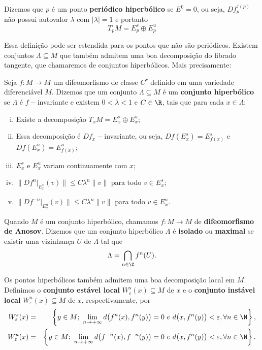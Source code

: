 Dizemos que $p$ é um ponto \textbf{periódico hiperbólico} se $E^0={0}$, ou seja, $Df_p^{\tau(p)}$ não possui autovalor $\lambda$ com $|\lambda|=1$ e portanto 
\begin{equation*}
T_pM=E_p^s\oplus E_p^u
\end{equation*}

Essa definição pode ser estendida para os pontos que não são periódicos. Existem conjuntos $\Lambda\subseteq M$ que também admitem uma boa decomposição do fibrado tangente, que chamaremos de conjuntos hiperbólicos. Mais precisamente:

\begin{definicao} Seja $f:M\to M$ um difeomorfismo de classe $C^r$ definido em uma variedade diferenciável $M$. Dizemos que um conjunto $\Lambda\subseteq M$ é um \textbf{conjunto hiperbólico} se $\Lambda$ é $f-$invariante e existem $0<\lambda<1$ e $C\in\R$, tais que para cada $x\in\Lambda$:
\begin{enumerate}[i)]
\item Existe a decomposição $T_xM=E_x^s\oplus E_x^u$;
\item Essa decomposição é $Df_x-$invariante, ou seja, $Df(E_x^s)=E_{f(x)}^s$ e $Df(E_x^u)=E_{f(x)}^u$;
\item $E^s_x$ e $E^u_x$ variam continuamente com $x$;
\item $\|Df^n|_{E_x^s}(v)\|\leq C\lambda^n\|v\|$ para todo $v\in E^s_x$;
\item $\|Df^{-n}|_{E_x^u}(v)\|\leq C\lambda^n\|v\|$ para todo $v\in E^u_x$.
\end{enumerate}
\end{definicao}

Quando $M$ é um conjunto hiperbólico, chamamos $f:M\to M$ de \textbf{difeomorfismo de Anosov}. Dizemos que um conjunto hiperbólico $\Lambda$ é \textbf{isolado} ou \textbf{maximal} se existir uma vizinhança $U$ de $\Lambda$ tal que $$\Lambda=\bigcap_{n\in\Z}f^n(U).$$ 

Os pontos hiperbólicos também admitem uma boa decomposição local em $M$. Definimos o \textbf{conjunto estável local} $W^s_{\varepsilon}(x)\subseteq M$ de $x$ e o \textbf{conjunto instável local} $W^u_{\varepsilon}(x)\subseteq M$ de $x$, respectivamente, por
\begin{eqnarray*}
W^s_{\varepsilon}(x) & = & \left\{y\in M;\ \lim_{n\to+\infty}d\big(f^n(x),f^n(y)\big)=0\ e\ d\big(x,f^n(y)\big)<\varepsilon,\forall n\in\N\right\},\\
W^u_{\varepsilon}(x) & = & \left\{y\in M;\ \lim_{n\to+\infty}d\big(f^{-n}(x),f^{-n}(y)\big)=0\ e \ d\big(x,f^n(y)\big)<\varepsilon,\forall n\in\N\right\}.
\end{eqnarray*}

